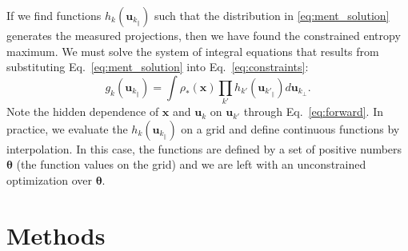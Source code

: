 \documentclass[%
    reprint,
    twocolumn,
    amsmath,
    amssymb,
    aps,
    prstab,
]{revtex4-2}
\begin{document}
If we find functions $h_k(\bm{u}_{k_\parallel})$ such that the distribution in \eqref{eq:ment_solution} generates the measured projections, then we have found the constrained entropy maximum. We must solve the system of integral equations that results from substituting Eq.~\eqref{eq:ment_solution} into Eq.~\eqref{eq:constraints}:
%
\begin{equation}\label{eq:ment_system}
    {g}_k(\bm{u}_{k_\parallel}) = 
    \int 
    \rho_*(\bm{x})
    \prod_{k'} h_{k'} ( \bm{u}_{{k'}_\parallel} )
    d\bm{u}_{k_\perp} .
\end{equation}
%
Note the hidden dependence of $\bm{x}$ and $\bm{u}_k$ on $\bm{u}_{k'}$ through Eq.~\eqref{eq:forward}. In practice, we evaluate the $h_k(\bm{u}_{k_\parallel})$ on a grid and define continuous functions by interpolation. In this case, the functions are defined by a set of positive numbers $\bm{\theta}$ (the function values on the grid) and we are left with an unconstrained optimization over $\bm{\theta}$.



\section{Methods}\label{sec:methods}
\end{document}
